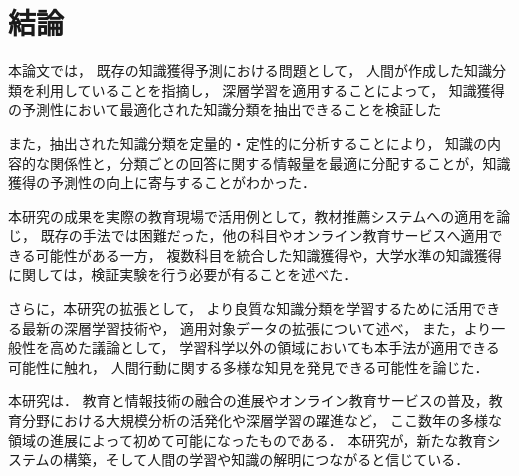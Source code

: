 \chapter{結論}
\label{chap:conlusion}
\fancyhf{}
\rhead{\thepage}
\cfoot{\thepage}


本論文では，
既存の知識獲得予測における問題として，
人間が作成した知識分類を利用していることを指摘し，
深層学習を適用することによって，
知識獲得の予測性において最適化された知識分類を抽出できることを検証した

また，抽出された知識分類を定量的・定性的に分析することにより，
知識の内容的な関係性と，分類ごとの回答に関する情報量を最適に分配することが，知識獲得の予測性の向上に寄与することがわかった．
\vvspace

本研究の成果を実際の教育現場で活用例として，教材推薦システムへの適用を論じ，
既存の手法では困難だった，他の科目やオンライン教育サービスへ適用できる可能性がある一方，
複数科目を統合した知識獲得や，大学水準の知識獲得に関しては，検証実験を行う必要が有ることを述べた．
\vvspace


さらに，本研究の拡張として，
より良質な知識分類を学習するために活用できる最新の深層学習技術や，
適用対象データの拡張について述べ，
また，より一般性を高めた議論として，
学習科学以外の領域においても本手法が適用できる可能性に触れ，
人間行動に関する多様な知見を発見できる可能性を論じた．
\vvspace

本研究は．
教育と情報技術の融合の進展やオンライン教育サービスの普及，教育分野における大規模分析の活発化や深層学習の躍進など，
ここ数年の多様な領域の進展によって初めて可能になったものである．
本研究が，新たな教育システムの構築，そして人間の学習や知識の解明につながると信じている．
